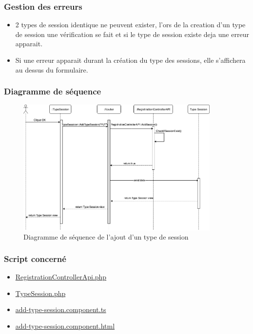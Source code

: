 \vspace{\baselineskip}
\subsubsection{Gestion des erreurs}
	\begin{itemize}
		\item 2 types de session identique ne peuvent exister, l'ors de la creation d'un type de session une vérification se fait et si le type de session existe deja une erreur apparait.
		\item Si une erreur apparait durant la création du type des sessions, elle s'affichera au dessus du formulaire. 
	\end{itemize}

\newpage
\subsubsection{Diagramme de séquence}
	\begin{figure}[h]
		\includegraphics[width=0.9\textwidth,center]{Diagramme/sequence-us12}
		\caption{Diagramme de séquence de l'ajout d'un type de session}
	\end{figure}

\subsubsection{Script concerné}
	\begin{itemize}
		\item \href{https://github.com/victorsmits/Aquabike/blob/master/backend/src/Controller/API/RegistrationControllerApi.php}{RegistrationControllerApi.php}
		\item \href{https://github.com/victorsmits/Aquabike/blob/master/backend/src/Entity/TypeSession.php}{TypeSession.php}
		\item \href{https://github.com/victorsmits/Aquabike/blob/master/frontend/src/app/type-session/add-type-session.component.ts}{add-type-session.component.ts}
		\item \href{https://github.com/victorsmits/Aquabike/blob/master/frontend/src/app/type-session/add-type-session.component.html}{add-type-session.component.html}
	\end{itemize}
